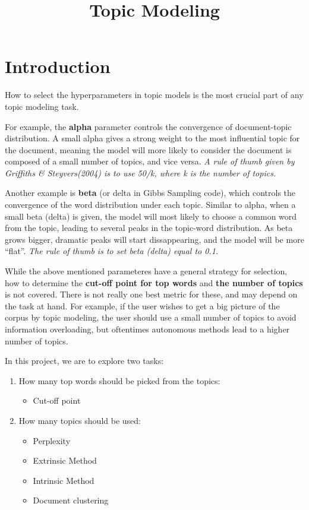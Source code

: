 \documentclass[]{article}
\title{Topic Modeling}
\author{}
\date{\vspace{-2.5em}}
\providecommand{\tightlist}{%
  \setlength{\itemsep}{0pt}\setlength{\parskip}{0pt}}
\begin{document}
\maketitle

{
\setcounter{tocdepth}{2}
\tableofcontents
}
\hypertarget{introduction}{%
\section{Introduction}\label{introduction}}

How to select the hyperparameters in topic models is the most crucial
part of any topic modeling task.

For example, the \textbf{alpha} parameter controls the convergence of
document-topic distribution. A small alpha gives a strong weight to the
most influential topic for the document, meaning the model will more
likely to consider the document is composed of a small number of topics,
and vice versa. \emph{A rule of thumb given by Griffiths \&
Steyvers(2004) is to use 50/k, where k is the number of topics.}

Another example is \textbf{beta} (or delta in Gibbs Sampling code),
which controls the convergence of the word distribution under each
topic. Similar to alpha, when a small beta (delta) is given, the model
will most likely to choose a common word from the topic, leading to
several peaks in the topic-word distribution. As beta grows bigger,
dramatic peaks will start dissappearing, and the model will be more
``flat''. \emph{The rule of thumb is to set beta (delta) equal to 0.1.}

While the above mentioned parameteres have a general strategy for
selection, how to determine the \textbf{cut-off point for top words} and
\textbf{the number of topics} is not covered. There is not really one
best metric for these, and may depend on the task at hand. For example,
if the user wishes to get a big picture of the corpus by topic modeling,
the user should use a small number of topics to avoid information
overloading, but oftentimes autonomous methods lead to a higher number
of topics.

In this project, we are to explore two tasks:

\begin{enumerate}
\def\labelenumi{\arabic{enumi}.}
\tightlist
\item
  How many top words should be picked from the topics:

  \begin{itemize}
  \tightlist
  \item
    Cut-off point
  \end{itemize}
\item
  How many topics should be used:

  \begin{itemize}
  \tightlist
  \item
    Perplexity
  \item
    Extrinsic Method
  \item
    Intrinsic Method
  \item
    Document clustering
  \end{itemize}
\end{enumerate}
\end{document}
